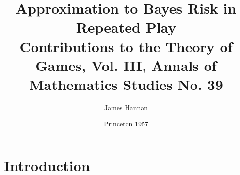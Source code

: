 \documentclass[11pt]{article}
\title{
    \huge Approximation to Bayes Risk in Repeated Play\\
    \vspace{10pt}
    \Large Contributions to the Theory of Games, Vol. III, Annals of Mathematics Studies No. 39
}
\author{James Hannan}
\date{Princeton 1957}
\numberwithin{equation}{section}
\theoremstyle{boldStyle}
\begin{document}
\maketitle





\section{Introduction}
\end{document}
